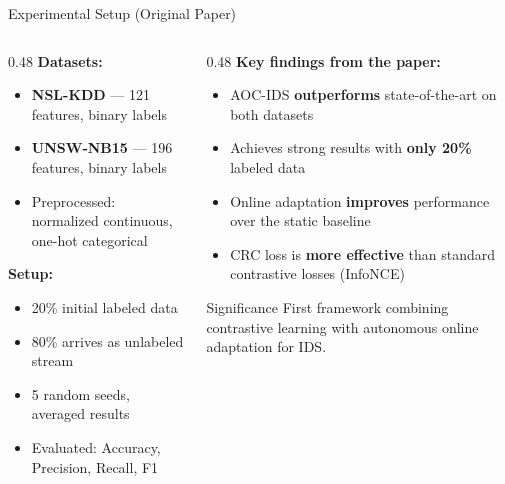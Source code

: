 \documentclass[aspectratio=169]{beamer}
\begin{document}
\begin{frame}{Experimental Setup (Original Paper)}
    \begin{columns}[T]
        \begin{column}{0.48\textwidth}
            \textbf{Datasets:}
            \begin{itemize}
                \item \textbf{NSL-KDD} — 121 features, binary labels
                \item \textbf{UNSW-NB15} — 196 features, binary labels
                \item Preprocessed: normalized continuous, one-hot categorical
            \end{itemize}

            \vspace{0.3cm}
            \textbf{Setup:}
            \begin{itemize}
                \item 20\% initial labeled data
                \item 80\% arrives as unlabeled stream
                \item 5 random seeds, averaged results
                \item Evaluated: Accuracy, Precision, Recall, F1
            \end{itemize}
        \end{column}
        \begin{column}{0.48\textwidth}
            \textbf{Key findings from the paper:}
            \begin{itemize}
                \item AOC-IDS \textbf{outperforms} state-of-the-art on both datasets
                \item Achieves strong results with \textbf{only 20\%} labeled data
                \item Online adaptation \textbf{improves} performance over the static baseline
                \item CRC loss is \textbf{more effective} than standard contrastive losses (InfoNCE)
            \end{itemize}

            \vspace{0.2cm}
            \begin{block}{Significance}
                First framework combining contrastive learning with autonomous online adaptation for IDS.
            \end{block}
        \end{column}
    \end{columns}
\end{frame}
\end{document}
